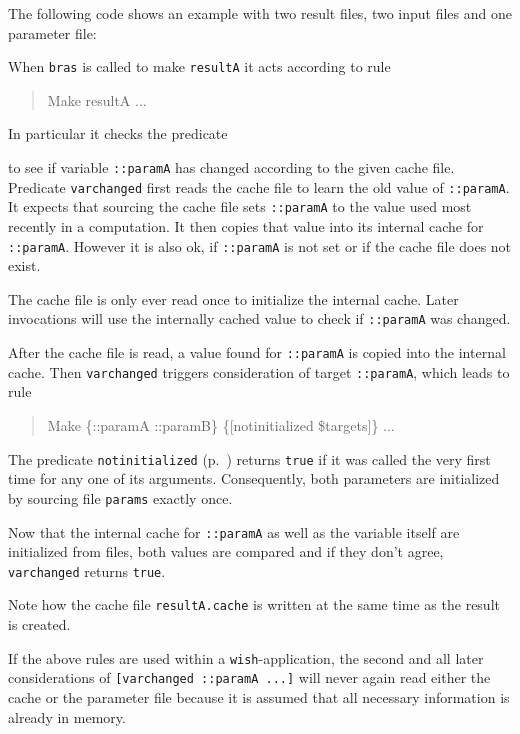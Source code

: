 \documentclass[11pt]{scrartcl}
\newcommand{\bras}{\texttt{bras}}
\begin{document}
\begin{Describe}
  The following code shows an example with two result files, two input 
  files and one parameter file:
  \begingroup\small
  
  \endgroup

  When \bras{} is called to make \texttt{resultA} it acts according to
  rule 
  \begin{quote}
    \ttfamily Make resultA ...
  \end{quote}
  In particular it checks the
  predicate 
  \begin{quote}
  \end{quote}
  to see if variable \texttt{::paramA} has changed according to the
  given cache file. Predicate \texttt{varchanged} first reads the
  cache file to learn the old value of \texttt{::paramA}. It expects
  that sourcing the cache file sets \texttt{::paramA} to the value
  used most recently in a computation. It then copies that value into
  its internal cache for \texttt{::paramA}. However it is also ok, if
  \texttt{::paramA} is not set or if the cache file does not exist. 

  The cache file is only ever read once to initialize the internal
  cache. Later invocations will use the internally cached value to
  check if \texttt{::paramA} was changed.

  After the cache file is read, a value found for \texttt{::paramA} 
  is copied into the internal cache. Then \texttt{varchanged} triggers
  consideration of target \texttt{::paramA}, which leads to rule
  \begin{quote}
    \ttfamily Make \{::paramA ::paramB\} \{[notinitialized
    \$targets]\} ...\hspace*{-22pt}
  \end{quote}
  The predicate \texttt{notinitialized}
  (p.~\pageref{pred:notinitialized}) returns \texttt{true} if it was
  called the very first time for any one of
  its arguments. Consequently, both parameters are initialized by
  sourcing file \texttt{params} exactly once.

  Now that the internal cache for \texttt{::paramA} as well as the
  variable itself are initialized from files, both values are compared 
  and if they don't agree, \texttt{varchanged} returns \texttt{true}.

  Note how the cache file \texttt{resultA.cache} is written at the
  same time as the result is created.
  
  If the above rules are used within a \texttt{wish}-application, the
  second and all later considerations of \texttt{[varchanged ::paramA
    ...]} will never again read either the cache or the parameter file
  because it is assumed that all necessary information is already in
  memory.
\end{Describe}
\end{document}
